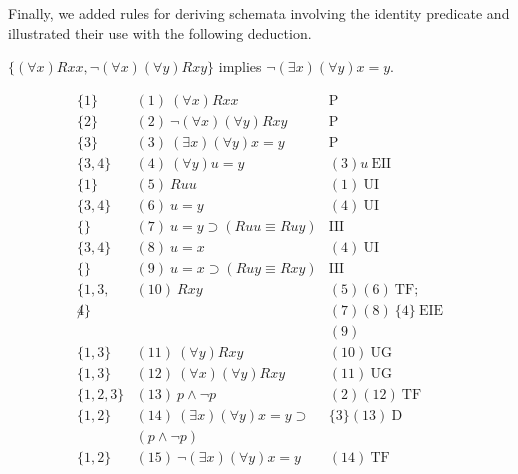 Finally, we added rules for deriving schemata involving the identity predicate and illustrated their use with the following deduction.
\begin{center}
$\{(\forall x) Rxx, \neg (\forall x)(\forall y) Rxy \}$
implies $\neg (\exists x)(\forall y) x = y$.
\end{center}
\[
\begin{array}{lll}
\{1\}   & (1)\ (\forall x) Rxx  & \mathrm{P}\\
\{2\}   & (2)\ \neg (\forall x)(\forall y) Rxy  & \mathrm{P}\\
\{3\}   & (3)\ (\exists x)(\forall y) x = y  & \mathrm{P}\\
\{3,4\}   & (4)\ (\forall y) u = y  & (3)u\ \mathrm{EII}\\
\{1\}   & (5)\ Ruu  & (1)\ \mathrm{UI}\\
\{3,4\}   & (6)\ u=y  & (4)\ \mathrm{UI}\\
\{\}   & (7)\ u=y \supset (Ruu \equiv Ruy) & \mathrm{III}\\
\{3,4\}   & (8)\ u=x  & (4)\ \mathrm{UI}\\
\{\}   & (9)\ u=x \supset (Ruy \equiv Rxy) & \mathrm{III}\\
\{1,3,   & (10)\ Rxy  & (5)(6)\ \mathrm{TF};\\
\not4\} &  & (7)(8)\ \{4\}\ \mathrm{EIE} \\
 & & (9)\\
\{1,3\}   & (11)\ (\forall y)Rxy  & (10)\ \mathrm{UG}\\
\{1,3\}   & (12)\ (\forall x)(\forall y)Rxy  & (11)\ \mathrm{UG}\\
\{1,2,3\}   & (13)\ p \wedge \neg p  & (2)(12)\ \mathrm{TF}\\
\{1,2\}   & (14)\ (\exists x)(\forall y) x = y  \supset
& \{3\}(13)\ \mathrm{D}\\
 & (p \wedge \neg p) & \\
\{1,2\}   & (15)\ \neg (\exists x)(\forall y) x = y  & (14)\ \mathrm{TF}
\end{array}
\]

